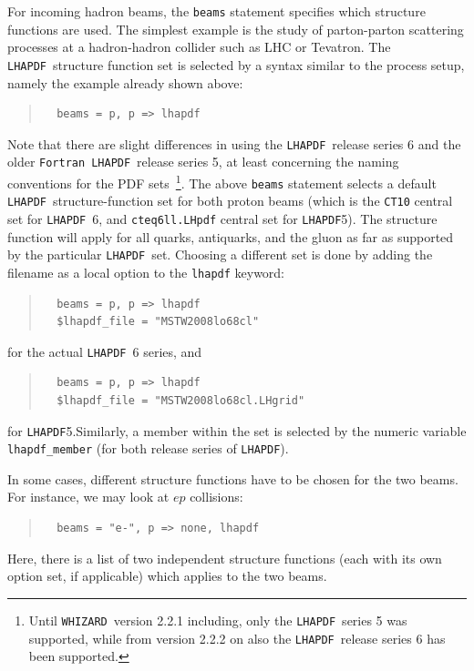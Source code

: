 \documentclass[12pt]{book}
\newcommand{\ttt}[1]{\texttt{#1}}
\newcommand{\whizard}{\ttt{WHIZARD}}
\newcommand{\lhapdf}{\ttt{LHAPDF}}
\newcommand{\fortran}{\ttt{Fortran}}
\begin{document}
For incoming hadron beams, the \ttt{beams} statement specifies which structure
functions are used.  The simplest example is the study of parton-parton
scattering processes at a hadron-hadron collider such as LHC or Tevatron.  The
\lhapdf\ structure function set is selected by a syntax similar to the
process setup, namely the example already shown above:
\begin{quote}
\begin{footnotesize}
\begin{verbatim}
  beams = p, p => lhapdf
\end{verbatim}
\end{footnotesize}
\end{quote}
Note that there are slight differences in using the \lhapdf\ release
series 6 and the older \fortran\ \lhapdf\ release series 5, at least
concerning the naming conventions for the PDF sets~\footnote{Until
  \whizard\ version 2.2.1 including, only the \lhapdf\ series 5 was
  supported, while from version 2.2.2 on also the \lhapdf\ release
  series 6 has been supported.}. The above \ttt{beams}
statement selects a default \lhapdf\ structure-function set for both
proton beams (which is the \ttt{CT10} central set for \lhapdf\ 6, and
\ttt{cteq6ll.LHpdf} central set for \lhapdf 5).  The structure
function will apply for all quarks, antiquarks, and the gluon as far
as supported by the particular \lhapdf\ set.  Choosing a different set
is done by adding the  filename as a local option to the \ttt{lhapdf}
keyword:
\begin{quote}
\begin{footnotesize}
\begin{verbatim}
  beams = p, p => lhapdf
  $lhapdf_file = "MSTW2008lo68cl"
\end{verbatim}
\end{footnotesize}
\end{quote}
for the actual \lhapdf\ 6 series, and
\begin{quote}
\begin{footnotesize}
\begin{verbatim}
  beams = p, p => lhapdf
  $lhapdf_file = "MSTW2008lo68cl.LHgrid"
\end{verbatim}
\end{footnotesize}
\end{quote}
for \lhapdf 5.Similarly, a member within the set is selected by the
numeric variable \verb|lhapdf_member| (for both release series of \lhapdf).

In some cases, different structure functions have to be chosen for the two
beams.  For instance, we may look at $ep$ collisions:
\begin{quote}
\begin{footnotesize}
\begin{verbatim}
  beams = "e-", p => none, lhapdf
\end{verbatim}
\end{footnotesize}
\end{quote}
Here, there is a list of two independent structure functions (each with its
own option set, if applicable) which applies to the two beams.
\end{document}
